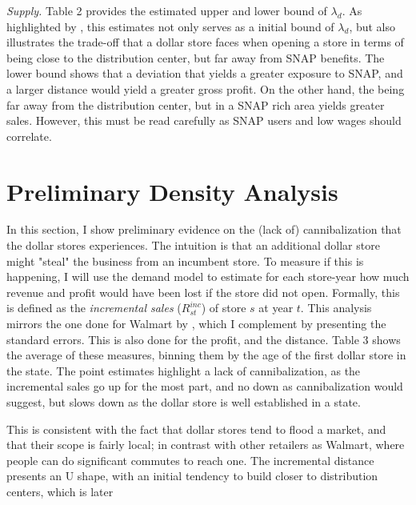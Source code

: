 \documentclass[11.5pt]{article}
\begin{document}




\newpage
\textit{Supply.} Table 2 provides the estimated upper and lower bound of $\lambda_d$. As highlighted by \citeauthor{houde2023nexus} \citeyear{houde2023nexus}, this estimates not only serves as a initial bound of $\lambda_d$, but also illustrates the trade-off that a dollar store faces when opening a store in terms of being close to the distribution center, but far away from SNAP benefits. The lower bound shows that a deviation that yields a greater exposure to SNAP, and a larger distance would yield a greater gross profit. On the other hand, the being far away from the distribution center, but in a SNAP rich area yields greater sales. However, this must be read carefully as SNAP users and low wages should correlate. 



\section{Preliminary Density Analysis}

In this section, I show preliminary evidence on the (lack of) cannibalization that the dollar stores experiences. The intuition is that an additional dollar store might "steal" the business from an incumbent store. To measure if this is happening, I will use the demand model to estimate for each store-year how much revenue and profit would have been lost if the store did not open. Formally, this is defined as the \textit{incremental sales} ($R^{inc}_{st}$) of store $s$ at year $t$. This analysis mirrors the one done for Walmart by \citeauthor{holmes2011diffusion} \citeyear{holmes2011diffusion}, which I complement by presenting the standard errors. This is also done for the profit, and the distance. Table 3 shows the average of these measures, binning them by the age of the first dollar store in the state. The point estimates highlight a lack of cannibalization, as the incremental sales go up for the most part, and no down as cannibalization would suggest, but slows down as the dollar store is well established in a state. 


This is consistent with the fact that dollar stores tend to flood a market, and that their scope is fairly local; in contrast with other retailers as Walmart, where people can do significant commutes to reach one. The incremental distance presents an U shape, with an initial tendency to build closer to distribution centers, which is later 
\end{document}
